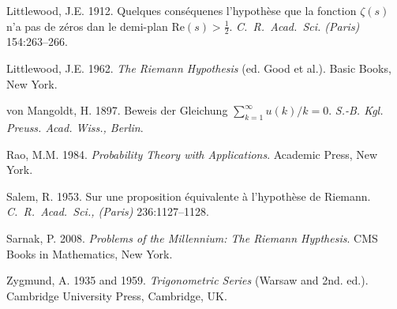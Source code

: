 \documentclass[11pt]{article}
\begin{document}
\begin{thebibliography}{99}
 Littlewood, J.E. 1912. Quelques conséquenes l'hypothèse que la fonction $\zeta(s)$ n'a pas de zéros dan le demi-plan Re$(s) > \frac{1}{2}$. \emph{C.~R.~Acad.~Sci. (Paris)} 154:263--266.

 Littlewood, J.E. 1962. \emph{The Riemann Hypothesis} (ed. Good et al.). Basic Books, New York.

 von Mangoldt, H. 1897. Beweis der Gleichung $\sum_{k=1}^\infty u(k)/k = 0$. \emph{S.-B. Kgl. Preuss. Acad. Wiss., Berlin}.

 Rao, M.M. 1984. \emph{Probability Theory with Applications}. Academic Press, New York.

 Salem, R. 1953. Sur une proposition équivalente à l'hypothèse de Riemann. \emph{C.~R.~Acad.~Sci., (Paris)} 236:1127--1128.

 Sarnak, P. 2008. \emph{Problems of the Millennium: The Riemann Hypthesis}. CMS Books in Mathematics, New York.

 Zygmund, A. 1935 and 1959. \emph{Trigonometric Series} (Warsaw and 2nd. ed.). Cambridge University Press, Cambridge, UK.
\end{thebibliography}
\end{document}
